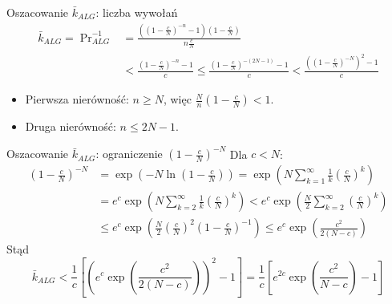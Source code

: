 \begin{frame}{Oszacowanie $\bar{k}_{ALG}$: liczba wywołań}
  \begin{align*}
    \bar{k}_{ALG} = \Pr\nolimits_{ALG}^{-1}
      &= \frac{\left(\left(1 - \frac{c}{N}\right)^{-n} - 1\right)
               \left(1 - \frac{c}{N}\right)}{n \frac{c}{N}} \\
      &< \frac{\left(1 - \frac{c}{N}\right)^{-n} - 1}{c}
      \leq \frac{\left(1 - \frac{c}{N}\right)^{-(2N-1)} - 1}{c}
      < \frac{\left(\left(1 - \frac{c}{N}\right)^{-N}\right)^{2} - 1}{c}
  \end{align*}
  \pause
  \begin{itemize}
    \item Pierwsza nierówność: $n \geq N$, więc
      $\frac{N}{n}\left(1 - \frac{c}{N}\right) < 1$.
    \item Druga nierówność: $n \leq 2N - 1$.
  \end{itemize}
\end{frame}

\begin{frame}{Oszacowanie $\bar{k}_{ALG}$: ograniczenie $\left(1 - \frac{c}{N}\right)^{-N}$}
  Dla $c < N$:
  \begin{align*}
    \left(1 - \frac{c}{N}\right)^{-N}
      &= \exp\left(-N \ln\left(1 - \frac{c}{N}\right)\right)
       = \exp\left(N \sum_{k=1}^{\infty} \frac{1}{k}\left(\frac{c}{N}\right)^{k}\right) \\
      &= e^{c} \exp\left(N \sum_{k=2}^{\infty} \frac{1}{k}\left(\frac{c}{N}\right)^{k}\right)
       < e^{c} \exp\left(\frac{N}{2} \sum_{k=2}^{\infty} \left(\frac{c}{N}\right)^{k}\right) \\
      &\leq e^{c} \exp\left(\frac{N}{2}\left(\frac{c}{N}\right)^{2}
            \left(1 - \frac{c}{N}\right)^{-1}\right)
       \leq e^{c} \exp\left(\frac{c^{2}}{2(N - c)}\right)
  \end{align*}
  \pause
  Stąd
  \[
    \bar{k}_{ALG}
      < \frac{1}{c}\left[\left(e^{c} \exp\left(\frac{c^{2}}{2(N-c)}\right)\right)^{2} - 1\right]
      = \frac{1}{c}\left[e^{2c} \exp\left(\frac{c^{2}}{N - c}\right) - 1\right]
  \]
\end{frame}

